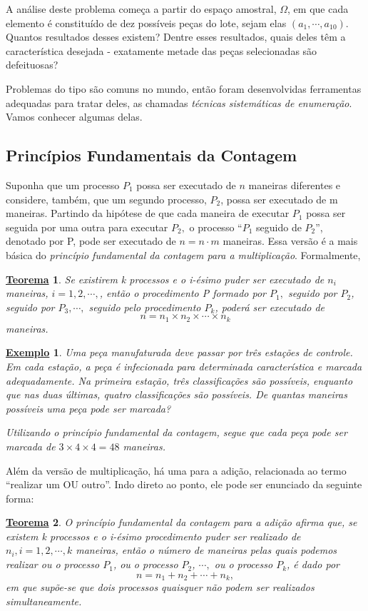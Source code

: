 \documentclass{article}
\newtheorem*{theorem*}{\underline{Teorema}}
\newtheorem{example}{\underline{Exemplo}}
\begin{document}
A análise deste problema começa a partir do espaço amostral, \(\Omega \), em que cada elemento
é constituído de dez possíveis peças do lote, sejam elas \((a_{1}, \cdots, a_{10})\). Quantos resultados
desses existem? Dentre esses resultados, quais deles têm a característica desejada - exatamente metade das
peças selecionadas são defeituosas?

Problemas do tipo são comuns no mundo, então foram desenvolvidas ferramentas adequadas para tratar deles, as chamadas
\textit{técnicas sistemáticas de enumeração}. Vamos conhecer algumas delas.
\subsection{Princípios Fundamentais da Contagem}
Suponha que um processo \(P_{1}\) possa ser executado de \(n\) maneiras diferentes e considere,
também, que um segundo processo, \(P_{2}\), possa ser executado de m maneiras. Partindo da hipótese de que
cada maneira de executar \(P_{1}\) possa ser seguida por uma outra para executar \(P_{2},\) o processo
``\(P_{1}\) seguido de \(P_{2}\)'', denotado por P, pode ser executado de \(n=n \cdot m\) maneiras. Essa versão é 
a mais básica do \textit{princípio fundamental da contagem para a multiplicação}. Formalmente,
\begin{theorem*}
  Se existirem k processos e o i-ésimo puder ser executado de \(n_{i}\) maneiras, \(i=1, 2, \cdots, \), então
  o procedimento P formado por \(P_{1},\) seguido por \(P_{2}\), seguido por \(P_{3}, \cdots,\) seguido pelo procedimento \(P_{k}\),
  poderá ser executado de 
  \[
    n = n_{1}\times n_{2}\times \cdots\times n_{k}
  \]
  maneiras.
\end{theorem*}
\begin{example}
  Uma peça manufaturada deve passar por três estações de controle. Em cada estação, a peça é
  infecionada para determinada característica e marcada adequadamente. Na primeira estação, três
  classificações são possíveis, enquanto que nas duas últimas, quatro classificações são possíveis. 
  De quantas maneiras possíveis uma peça pode ser marcada?

  Utilizando o princípio fundamental da contagem, segue que cada peça pode ser marcada de \(3\times 4\times 4 = 48\) maneiras.
\end{example}
Além da versão de multiplicação, há uma para a adição, relacionada ao termo ``realizar um OU outro''.
Indo direto ao ponto, ele pode ser enunciado da seguinte forma:
\begin{theorem*}
  O \textit{princípio fundamental da contagem para a adição} afirma que, se existem k processos
  e o i-ésimo procedimento puder ser realizado de \(n_{i}, i = 1, 2, \cdots, k\) maneiras, então
  o número de maneiras pelas quais podemos realizar ou o processo \(P_1\), ou o processo \(P_{2}\),
  \(\cdots,\) ou o processo \(P_{k}\), é dado por 
  \[
    n = n_1 + n_{2} + \cdots + n_{k},
  \]
  em que supõe-se que dois processos quaisquer não podem ser realizados simultaneamente.
\end{theorem*}
\end{document}
